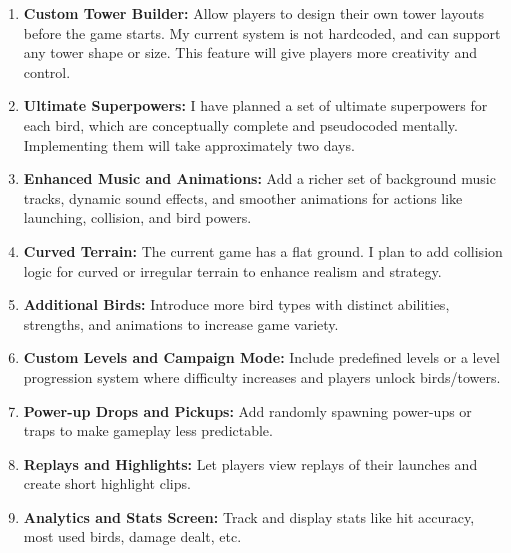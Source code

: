 \documentclass[10pt]{article}
\begin{document}
\begin{enumerate}
    \item \textbf{Custom Tower Builder:} Allow players to design their own tower layouts before the game starts. My current system is not hardcoded, and can support any tower shape or size. This feature will give players more creativity and control.
    
    \item \textbf{Ultimate Superpowers:} I have planned a set of ultimate superpowers for each bird, which are conceptually complete and pseudocoded mentally. Implementing them will take approximately two days.

    \item \textbf{Enhanced Music and Animations:} Add a richer set of background music tracks, dynamic sound effects, and smoother animations for actions like launching, collision, and bird powers.

    \item \textbf{Curved Terrain:} The current game has a flat ground. I plan to add collision logic for curved or irregular terrain to enhance realism and strategy.

    \item \textbf{Additional Birds:} Introduce more bird types with distinct abilities, strengths, and animations to increase game variety.

    \item \textbf{Custom Levels and Campaign Mode:} Include predefined levels or a level progression system where difficulty increases and players unlock birds/towers.
    \item \textbf{Power-up Drops and Pickups:} Add randomly spawning power-ups or traps to make gameplay less predictable.

    \item \textbf{Replays and Highlights:} Let players view replays of their launches and create short highlight clips.

    \item \textbf{Analytics and Stats Screen:} Track and display stats like hit accuracy, most used birds, damage dealt, etc.
\end{enumerate}
\end{document}
